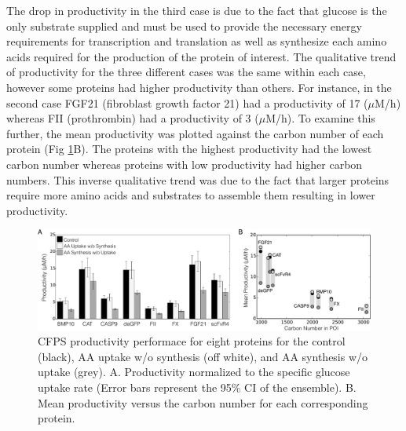 \documentclass[journal=asbcd6,manuscript=article]{achemso}
\begin{document}
The drop in productivity in the third case is due to the fact that glucose is the only substrate supplied and must be used to provide the necessary energy requirements for transcription and translation as well as synthesize each amino acids required for the production of the protein of interest.  
The qualitative trend of productivity for the three different cases was the same within each case, however some proteins had higher productivity than others.
For instance, in the second case FGF21 (fibroblast growth factor 21) had a productivity of 17 ($\mu$M/h) whereas FII (prothrombin) had a productivity of 3 ($\mu$M/h).
To examine this further, the mean productivity was plotted against the carbon number of each protein (Fig \ref{fig:Prod_POI}B).
The proteins with the highest productivity had the lowest carbon number whereas proteins with low productivity had higher carbon numbers.
This inverse qualitative trend was due to the fact that larger proteins require more amino acids and substrates to assemble them resulting in lower productivity.
\begin{figure}[t!]
\centering
\includegraphics[width=1.00\textwidth]{./Figures/Prod_POI.pdf}
\caption{CFPS productivity performace for eight proteins for the control (black), AA uptake w/o synthesis (off white), and AA synthesis w/o uptake (grey). A. Productivity normalized to the specific glucose uptake rate (Error bars represent the 95\% CI of the ensemble). B. Mean productivity versus the carbon number for each corresponding protein.}
\label{fig:Prod_POI}
\end{figure}
\end{document}
